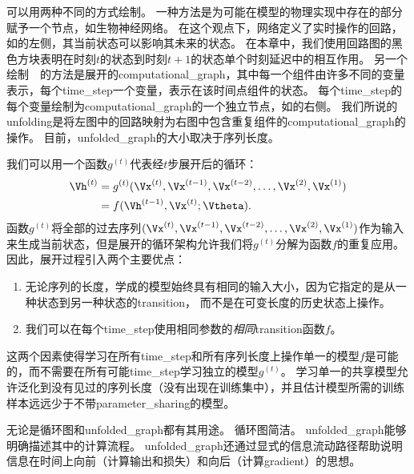 
可以用两种不同的方式绘制。
一种方法是为可能在模型的物理实现中存在的部分赋予一个节点，如生物神经网络。
在这个观点下，网络定义了实时操作的回路，如的左侧，其当前状态可以影响其未来的状态。
在本章中，我们使用回路图的黑色方块表明在时刻$t$的状态到时刻$t+1$的状态单个时刻延迟中的相互作用。
另一个绘制~~的方法是展开的\gls{computational_graph}，其中每一个组件由许多不同的变量表示，每个\gls{time_step}一个变量，表示在该时间点组件的状态。
每个\gls{time_step}的每个变量绘制为\gls{computational_graph}的一个独立节点，如的右侧。
我们所说的\gls{unfolding}是将左图中的回路映射为右图中包含重复组件的\gls{computational_graph}的操作。
目前，\gls{unfolded_graph}的大小取决于序列长度。

我们可以用一个函数$g^{(t)}$代表经$t$步展开后的循环：
\begin{align}
\label{eq:106}
  \Vh^{(t)} &=g^{(t)}(\Vx^{(t)},\Vx^{(t-1)}, \Vx^{(t-2)},\dots,\Vx^{(2)}, \Vx^{(1)}) \\
  & =  f(\Vh^{(t-1)}, \Vx^{(t)} ; \Vtheta) .
\end{align}
函数$g^{(t)}$将全部的过去序列$(\Vx^{(t)},\Vx^{(t-1)}, \Vx^{(t-2)},\dots,\Vx^{(2)}, \Vx^{(1)})$作为输入来生成当前状态，但是展开的循环架构允许我们将$g^{(t)}$分解为函数$f$的重复应用。
因此，展开过程引入两个主要优点：
\begin{enumerate}
 \item 无论序列的长度，学成的模型始终具有相同的输入大小，因为它指定的是从一种状态到另一种状态的\gls{transition}， 而不是在可变长度的历史状态上操作。
 \item 我们可以在每个\gls{time_step}使用相同参数的\emph{相同}\gls{transition}函数$f$。
\end{enumerate}
这两个因素使得学习在所有\gls{time_step}和所有序列长度上操作单一的模型$f$是可能的，而不需要在所有可能\gls{time_step}学习独立的模型$g^{(t)}$。
学习单一的共享模型允许泛化到没有见过的序列长度（没有出现在训练集中），并且估计模型所需的训练样本远远少于不带\gls{parameter_sharing}的模型。


无论是循环图和\gls{unfolded_graph}都有其用途。
循环图简洁。
\gls{unfolded_graph}能够明确描述其中的计算流程。
\gls{unfolded_graph}还通过显式的信息流动路径帮助说明信息在时间上向前（计算输出和损失）和向后（计算\gls{gradient}）的思想。

